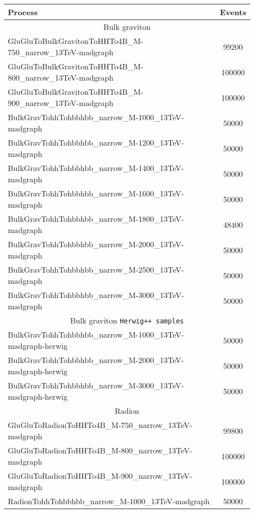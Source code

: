 \begin{table}[h!]
  \begin{center}
    \begin{tabular}{l|c}
      \hline
      \hline
      Process & Events\\ 
      \hline
      \multicolumn{2}{c}{Bulk graviton} \\ \cline{1-2}
      {GluGluToBulkGravitonToHHTo4B\_M-750\_narrow\_13TeV-madgraph}  &99200 \\
      {GluGluToBulkGravitonToHHTo4B\_M-800\_narrow\_13TeV-madgraph}  &100000 \\
      {GluGluToBulkGravitonToHHTo4B\_M-900\_narrow\_13TeV-madgraph}  &100000 \\
      {BulkGravTohhTohbbhbb\_narrow\_M-1000\_13TeV-madgraph}  &50000 \\
      {BulkGravTohhTohbbhbb\_narrow\_M-1200\_13TeV-madgraph}  & 50000 \\
      {BulkGravTohhTohbbhbb\_narrow\_M-1400\_13TeV-madgraph}  & 50000 \\
      {BulkGravTohhTohbbhbb\_narrow\_M-1600\_13TeV-madgraph}  & 50000 \\
      {BulkGravTohhTohbbhbb\_narrow\_M-1800\_13TeV-madgraph}  & 48400 \\
      {BulkGravTohhTohbbhbb\_narrow\_M-2000\_13TeV-madgraph}  & 50000 \\
      {BulkGravTohhTohbbhbb\_narrow\_M-2500\_13TeV-madgraph}  & 50000 \\
      {BulkGravTohhTohbbhbb\_narrow\_M-3000\_13TeV-madgraph}  & 50000 \\
      \hline
      \multicolumn{2}{c}{Bulk graviton \texttt{Herwig++ samples}} \\ \cline{1-2}
      {BulkGravTohhTohbbhbb\_narrow\_M-1000\_13TeV-madgraph-herwig}   & 50000 \\
      {BulkGravTohhTohbbhbb\_narrow\_M-2000\_13TeV-madgraph-herwig}  & 50000 \\
      {BulkGravTohhTohbbhbb\_narrow\_M-3000\_13TeV-madgraph-herwig}  & 50000 \\
      \hline
      \multicolumn{2}{c}{Radion} \\ \cline{1-2}
      \hline
      {GluGluToRadionToHHTo4B\_M-750\_narrow\_13TeV-madgraph}  &99800 \\
      {GluGluToRadionToHHTo4B\_M-800\_narrow\_13TeV-madgraph}  &100000 \\
      {GluGluToRadionToHHTo4B\_M-900\_narrow\_13TeV-madgraph}  &100000 \\
      {RadionTohhTohbbhbb\_narrow\_M-1000\_13TeV-madgraph}   & 50000 \\

\end{tabular}
\end{center}
\end{table}
